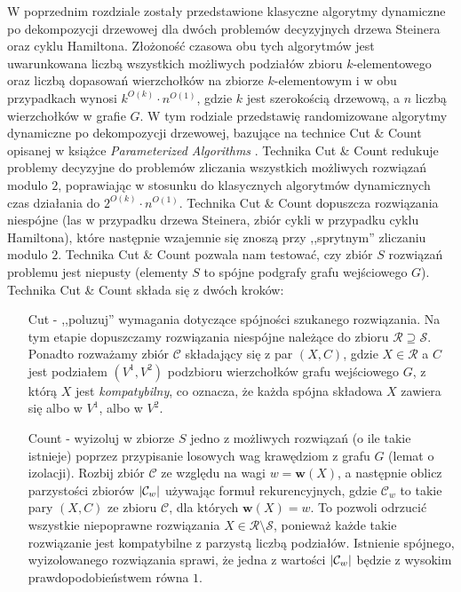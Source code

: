 \documentclass[12pt, oneside]{report}
\newcommand\Omicron{O}
\begin{document}
W poprzednim rozdziale zostały przedstawione klasyczne algorytmy dynamiczne po dekompozycji drzewowej dla dwóch problemów decyzyjnych drzewa Steinera oraz cyklu Hamiltona. Złożoność czasowa obu tych algorytmów jest uwarunkowana liczbą wszystkich możliwych podziałów zbioru $k$-elementowego oraz liczbą dopasowań wierzchołków na zbiorze $k$-elementowym i w obu przypadkach wynosi $k^{\Omicron{(k)}} \cdot n^{\Omicron{(1)}}$, gdzie $k$ jest szerokością drzewową, a $n$ liczbą wierzchołków w grafie $G$.
W tym rodziale przedstawię randomizowane algorytmy dynamiczne po dekompozycji drzewowej, bazujące na technice Cut \& Count opisanej w książce \emph{Parameterized Algorithms} \cite{parametrized_algorithms}. Technika Cut \& Count redukuje problemy decyzyjne do problemów zliczania wszystkich możliwych rozwiązań modulo $2$, poprawiając w stosunku do klasycznych algorytmów dynamicznych czas działania do $2^{\Omicron{(k)}} \cdot n^{\Omicron{(1)}}$. Technika Cut \& Count dopuszcza rozwiązania niespójne (las w przypadku drzewa Steinera, zbiór cykli w przypadku cyklu Hamiltona), które następnie wzajemnie się znoszą przy ,,sprytnym'' zliczaniu modulo $2$. Technika Cut \& Count pozwala nam testować, czy zbiór $S$ rozwiązań problemu jest niepusty (elementy $S$ to spójne podgrafy grafu wejściowego $G$).\newline\newline
Technika Cut \& Count składa się z dwóch kroków:

\begin{enumerate}

\item[Cut] - ,,poluzuj'' wymagania dotyczące spójności szukanego rozwiązania. Na tym etapie dopuszczamy rozwiązania niespójne należące do zbioru $\mathcal{R} \supseteq \mathcal{S}$. Ponadto rozważamy zbiór $\mathcal{C}$ składający się z par $(X, C)$, gdzie $X \in \mathcal{R}$ a $C$ jest podziałem $(V^1, V^2)$ podzbioru wierzchołków grafu wejściowego $G$, z którą $X$ jest \emph{kompatybilny}, co oznacza, że każda spójna składowa $X$ zawiera się albo w $V^1$, albo w $V^2$.  

\item[Count] - wyizoluj w zbiorze $S$ jedno z możliwych rozwiązań (o ile takie istnieje) poprzez przypisanie losowych wag krawędziom z grafu $G$ (lemat o izolacji). Rozbij zbiór $\mathcal{C}$ ze względu na wagi $w = \mathbf{w}(X)$, a następnie oblicz parzystości zbiorów $\abs{\mathcal{C}_w}$ używając formuł rekurencyjnych, gdzie $\mathcal{C}_w$ to takie pary $(X,C)$ ze zbioru $\mathcal{C}$, dla których $\mathbf{w}(X) = w$. To pozwoli odrzucić wszystkie niepoprawne rozwiązania $X \in \mathcal{R} \setminus \mathcal{S}$, ponieważ każde takie rozwiązanie jest kompatybilne z parzystą liczbą podziałów. Istnienie spójnego, wyizolowanego rozwiązania sprawi, że jedna z wartości $\abs{\mathcal{C}_w}$ będzie z wysokim prawdopodobieństwem równa $1$.

\end{enumerate}
\end{document}
